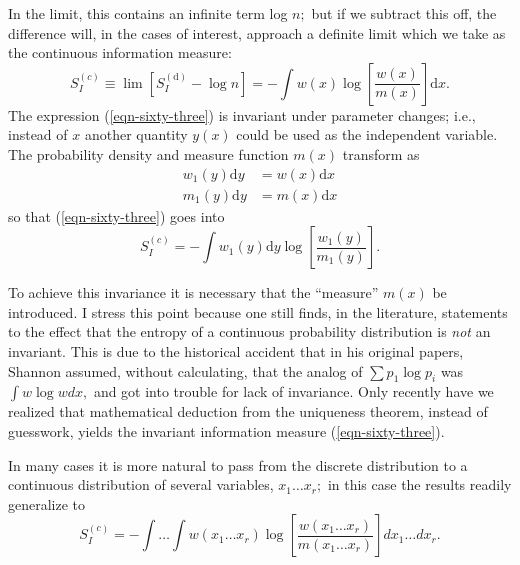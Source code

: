 \documentclass[]{article}
\begin{document}
In the limit, this contains an infinite term log $n ;$ but if we subtract this off, the difference will, in the cases of interest, approach a definite limit which we take as the continuous information measure:
\begin{equation}
S _{ I }^{( c )} \equiv \lim \left[ S _{ I }^{(\text{d})}-\log n \right]=-\int w ( x ) \log \left[\frac{ w ( x )}{ m ( x )}\right]\text{d}x .\label{eqn-sixty-three}
\end{equation}
The expression (\ref{eqn-sixty-three}) is invariant under parameter changes; i.e., instead of $x$ another quantity $y(x)$ could be used as the independent variable. The probability density and measure function $m ( x )$ transform as
\begin{align*}
w_{1}(y)\text{d}y & =w(x)\text{d}x \\
m_{1}(y)\text{d}y & =m(x)\text{d}x
\end{align*}
so that (\ref{eqn-sixty-three}) goes into
\begin{equation}
S_{I}^{(c)}=-\int w_{1}(y)\text{d}y \log \left[\frac{w_{1}(y)}{m_{1}(y)}\right].
\end{equation}

To achieve this invariance it is necessary that the ``measure'' $m ( x )$ be introduced. I stress this point because one still finds, in the literature, statements to the effect that the entropy of a continuous probability distribution is \emph{not} an invariant. This is due to the historical accident that in his original papers, Shannon\citep{Shannon-mathematical48} assumed, without calculating, that the analog of $\sum p _{1} \log p _{ i }$ was $\int w \log w dx ,$ and got into trouble for lack of invariance. Only recently have we realized that mathematical deduction from the uniqueness theorem, instead of guesswork, yields the invariant information measure (\ref{eqn-sixty-three}).

In many cases it is more natural to pass from the discrete distribution to a continuous distribution of several variables, $x_{1} \ldots x_{r} ;$ in this case the results readily generalize to
\begin{equation}
S _{ I }^{( c )}=-\int \ldots \int w \left( x _{1} \ldots x _{ r }\right) \log \left[\frac{ w \left( x _{1} \ldots x _{ r }\right)}{ m \left( x _{1} \ldots x _{ r }\right)}\right] dx _{1} \ldots dx_{r}. \label{eqn-sixty-five}
\end{equation}
\end{document}
